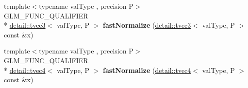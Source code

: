 \begin{DoxyCompactItemize}
\item 
\hypertarget{namespaceglm_a79d69adf577a32f7767c7471cb8b43ea}{{\footnotesize template$<$typename val\-Type , precision P$>$ }\\G\-L\-M\-\_\-\-F\-U\-N\-C\-\_\-\-Q\-U\-A\-L\-I\-F\-I\-E\-R \\*
\hyperlink{structglm_1_1detail_1_1tvec3}{detail\-::tvec3}$<$ val\-Type, P $>$ {\bfseries fast\-Normalize} (\hyperlink{structglm_1_1detail_1_1tvec3}{detail\-::tvec3}$<$ val\-Type, P $>$ const \&x)}\label{namespaceglm_a79d69adf577a32f7767c7471cb8b43ea}

\item 
\hypertarget{namespaceglm_afc8a546d803a5a95bc5a85423f757907}{{\footnotesize template$<$typename val\-Type , precision P$>$ }\\G\-L\-M\-\_\-\-F\-U\-N\-C\-\_\-\-Q\-U\-A\-L\-I\-F\-I\-E\-R \\*
\hyperlink{structglm_1_1detail_1_1tvec4}{detail\-::tvec4}$<$ val\-Type, P $>$ {\bfseries fast\-Normalize} (\hyperlink{structglm_1_1detail_1_1tvec4}{detail\-::tvec4}$<$ val\-Type, P $>$ const \&x)}\label{namespaceglm_afc8a546d803a5a95bc5a85423f757907}


\end{DoxyCompactItemize}
